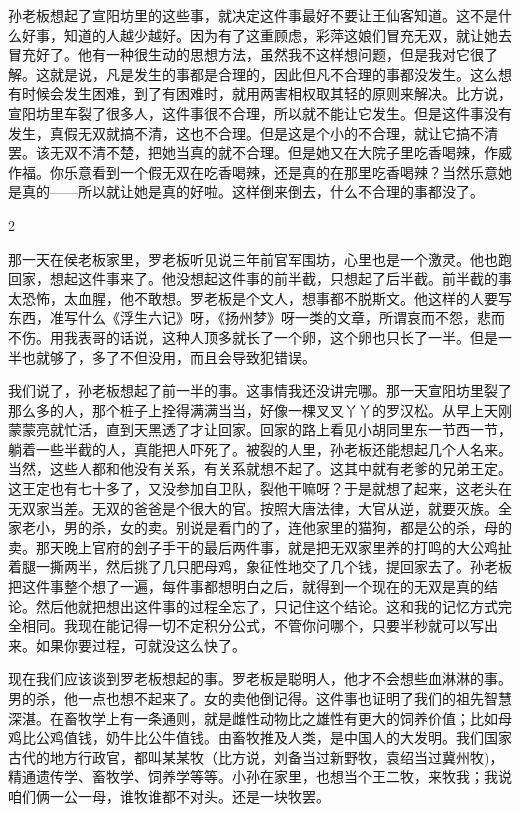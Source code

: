 孙老板想起了宣阳坊里的这些事，就决定这件事最好不要让王仙客知道。这不是什么好事，知道的人越少越好。因为有了这重顾虑，彩萍这娘们冒充无双，就让她去冒充好了。他有一种很生动的思想方法，虽然我不这样想问题，但是我对它很了解。这就是说，凡是发生的事都是合理的，因此但凡不合理的事都没发生。这么想有时候会发生困难，到了有困难时，就用两害相权取其轻的原则来解决。比方说，宣阳坊里车裂了很多人，这件事很不合理，所以就不能让它发生。但是这件事没有发生，真假无双就搞不清，这也不合理。但是这是个小的不合理，就让它搞不清罢。该无双不清不楚，把她当真的就不合理。但是她又在大院子里吃香喝辣，作威作福。你乐意看到一个假无双在吃香喝辣，还是真的在那里吃香喝辣？当然乐意她是真的——所以就让她是真的好啦。这样倒来倒去，什么不合理的事都没了。 

2 

那一天在侯老板家里，罗老板听见说三年前官军围坊，心里也是一个激灵。他也跑回家，想起这件事来了。他没想起这件事的前半截，只想起了后半截。前半截的事太恐怖，太血腥，他不敢想。罗老板是个文人，想事都不脱斯文。他这样的人要写东西，准写什么《浮生六记》呀，《扬州梦》呀一类的文章，所谓哀而不怨，悲而不伤。用我表哥的话说，这种人顶多就长了一个卵，这个卵也只长了一半。但是一半也就够了，多了不但没用，而且会导致犯错误。 

我们说了，孙老板想起了前一半的事。这事情我还没讲完哪。那一天宣阳坊里裂了那么多的人，那个桩子上拴得满满当当，好像一棵叉叉丫丫的罗汉松。从早上天刚蒙蒙亮就忙活，直到天黑透了才让回家。回家的路上看见小胡同里东一节西一节，躺着一些半截的人，真能把人吓死了。被裂的人里，孙老板还能想起几个人名来。当然，这些人都和他没有关系，有关系就想不起了。这其中就有老爹的兄弟王定。这王定也有七十多了，又没参加自卫队，裂他干嘛呀？于是就想了起来，这老头在无双家当差。无双的爸爸是个很大的官。按照大唐法律，大官从逆，就要灭族。全家老小，男的杀，女的卖。别说是看门的了，连他家里的猫狗，都是公的杀，母的卖。那天晚上官府的刽子手干的最后两件事，就是把无双家里养的打鸣的大公鸡扯着腿一撕两半，然后挑了几只肥母鸡，象征性地交了几个钱，提回家去了。孙老板把这件事整个想了一遍，每件事都想明白之后，就得到一个现在的无双是真的结论。然后他就把想出这件事的过程全忘了，只记住这个结论。这和我的记忆方式完全相同。我现在能记得一切不定积分公式，不管你问哪个，只要半秒就可以写出来。如果你要过程，可就没这么快了。 

现在我们应该谈到罗老板想起的事。罗老板是聪明人，他才不会想些血淋淋的事。男的杀，他一点也想不起来了。女的卖他倒记得。这件事也证明了我们的祖先智慧深湛。在畜牧学上有一条通则，就是雌性动物比之雄性有更大的饲养价值；比如母鸡比公鸡值钱，奶牛比公牛值钱。由畜牧推及人类，是中国人的大发明。我们国家古代的地方行政官，都叫某某牧（比方说，刘备当过新野牧，袁绍当过冀州牧)，精通遗传学、畜牧学、饲养学等等。小孙在家里，也想当个王二牧，来牧我；我说咱们俩一公一母，谁牧谁都不对头。还是一块牧罢。 

